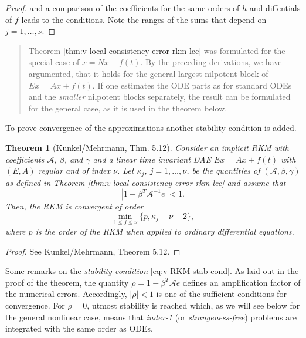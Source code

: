 \documentclass[]{book}
\newenvironment {JHSAYS} [0] {\begin{quote}\color{jhsc}} {\end{quote}}
\newtheorem{theorem}{Theorem}[chapter]
\theoremstyle{definition}
\theoremstyle{definition}
\theoremstyle{definition}
\theoremstyle{definition}
\theoremstyle{remark}
\begin{document}
\begin{proof}
and a comparison of the coefficients for the same orders of \(h\) and diffentials of \(f\) leads to the conditions. Note the ranges of the sums that depend on \(j=1, \dotsc, \nu\).
\end{proof}

\begin{JHSAYS}
Theorem \ref{thm:v-local-consistency-error-rkm-lcc} was formulated for the special case of \(\dot x = Nx +f(t)\). By the preceding derivations, we have argumented, that it holds for the general largest nilpotent block of \(E\dot x = Ax+f(t)\). If one estimates the ODE parts as for standard ODEs and the \emph{smaller} nilpotent blocks separately, the result can be formulated for the general case, as it is used in the theorem below.
\end{JHSAYS}

To prove convergence of the approximations another stability condition is added.

\begin{theorem}[Kunkel/Mehrmann, Thm. 5.12]
\protect\hypertarget{thm:v-convergence-RKM-LTI}{}{\label{thm:v-convergence-RKM-LTI} {} }Consider an implicit RKM with coefficients \(\mathcal A\), \(\beta\), and \(\gamma\) and a linear time invariant DAE \(E\dot x = Ax+f(t)\) with \((E,A)\) regular and of index \(\nu\). Let \(\kappa_j\), \(j=1,\dots,\nu\), be the quantities of \((\mathcal A,\beta, \gamma)\) as defined in Theorem \ref{thm:v-local-consistency-error-rkm-lcc} and assume that
\begin{equation}
| 1-\beta ^T\mathcal A^{-1}e| < 1. \label{eq:v-RKM-stab-cond}
\end{equation}
Then, the RKM is convergent of order
\begin{equation}
\min_{1\leq j \leq \nu}\{p, \kappa_j - \nu +2\},
\end{equation}
where \(p\) is the order of the RKM when applied to ordinary differential equations.
\end{theorem}

\begin{proof}
{}See Kunkel/Mehrmann, Theorem 5.12.
\end{proof}

Some remarks on the \emph{stability condition} \eqref{eq:v-RKM-stab-cond}. As laid out in the proof of the theorem, the quantity \(\rho = 1-\beta ^T\mathcal Ae\) defines an amplification factor of the numerical errors. Accordingly, \(|\rho| < 1\) is one of the sufficient conditions for convergence. For \(\rho = 0\), utmost stability is reached which, as we will see below for the general nonlinear case, means that \emph{index-1} (or \emph{strangeness-free}) problems are integrated with the same order as ODEs.
\end{document}
